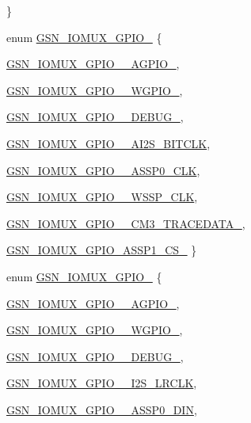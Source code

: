 \begin{DoxyCompactItemize}
 \}
\item 
enum \hyperlink{a00519_ac20155aedc6f2679ad6131330ea483e8}{GSN\_\-IOMUX\_\-GPIO\_} \{ \par
\hyperlink{a00519_ac20155aedc6f2679ad6131330ea483e8add367ae7843cf6c6de5ba68bb211350a}{GSN\_\-IOMUX\_\-GPIO\_\_\-AGPIO\_}, 
\par
\hyperlink{a00519_ac20155aedc6f2679ad6131330ea483e8af55c0d4a2bb027eceb42bbbba937ea70}{GSN\_\-IOMUX\_\-GPIO\_\_\-WGPIO\_}, 
\par
\hyperlink{a00519_ac20155aedc6f2679ad6131330ea483e8a275b79c56ea94de542641e130046ae2d}{GSN\_\-IOMUX\_\-GPIO\_\_\-DEBUG\_}, 
\par
\hyperlink{a00519_ac20155aedc6f2679ad6131330ea483e8af2fd0237b1d76f3e17170db083820b31}{GSN\_\-IOMUX\_\-GPIO\_\_\-AI2S\_\-BITCLK}, 
\par
\hyperlink{a00519_ac20155aedc6f2679ad6131330ea483e8acf25480ba3cec2d60f1b4bf04e59ca8c}{GSN\_\-IOMUX\_\-GPIO\_\_\-ASSP0\_\-CLK}, 
\par
\hyperlink{a00519_ac20155aedc6f2679ad6131330ea483e8a8fd7cb4086ec2fd9b58e6e8d7a065cdb}{GSN\_\-IOMUX\_\-GPIO\_\_\-WSSP\_\-CLK}, 
\par
\hyperlink{a00519_ac20155aedc6f2679ad6131330ea483e8a225bb4ee85d5c00c030ff7a8ba8bf122}{GSN\_\-IOMUX\_\-GPIO\_\_\-CM3\_\-TRACEDATA\_}, 
\par
\hyperlink{a00519_ac20155aedc6f2679ad6131330ea483e8a0dc6c4df63e88d830612ef8b07652774}{GSN\_\-IOMUX\_\-GPIO\_\-ASSP1\_\-CS\_}
 \}
\item 
enum \hyperlink{a00519_a70a451f18789dc2260867a28da10688c}{GSN\_\-IOMUX\_\-GPIO\_} \{ \par
\hyperlink{a00519_a70a451f18789dc2260867a28da10688caf7361c44e9083b80f284b2d764a47657}{GSN\_\-IOMUX\_\-GPIO\_\_\-AGPIO\_}, 
\par
\hyperlink{a00519_a70a451f18789dc2260867a28da10688cade9abb5b9290e53cbcfdd5b2a5e5f585}{GSN\_\-IOMUX\_\-GPIO\_\_\-WGPIO\_}, 
\par
\hyperlink{a00519_a70a451f18789dc2260867a28da10688cad866c18c9aa40fa45e309c6833a37f09}{GSN\_\-IOMUX\_\-GPIO\_\_\-DEBUG\_}, 
\par
\hyperlink{a00519_a70a451f18789dc2260867a28da10688caea4887216324390deec21c32088b39f5}{GSN\_\-IOMUX\_\-GPIO\_\_\-I2S\_\-LRCLK}, 
\par
\hyperlink{a00519_a70a451f18789dc2260867a28da10688ca5dd15d40ee4eb71f23931506beb8355c}{GSN\_\-IOMUX\_\-GPIO\_\_\-ASSP0\_\-DIN}, 
\par

\end{DoxyCompactItemize}
